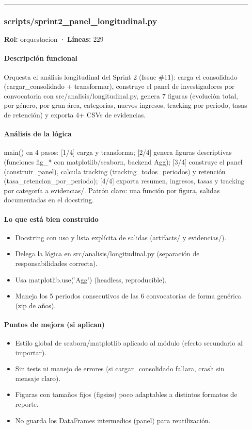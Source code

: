 \medskip
\hrule

\subsubsection{scripts/sprint2\_panel\_longitudinal.py}
\textbf{Rol:} orquestacion · \textbf{Líneas:} 229

\paragraph{Descripción funcional}
Orquesta el análisis longitudinal del Sprint 2 (Issue \#11): carga el consolidado (cargar\_consolidado + transformar), construye el panel de investigadores por convocatoria con src/analisis/longitudinal.py, genera 7 figuras (evolución total, por género, por gran área, categorías, nuevos ingresos, tracking por periodo, tasas de retención) y exporta 4+ CSVs de evidencias.

\paragraph{Análisis de la lógica}
main() en 4 pasos: [1/4] carga y transforma; [2/4] genera figuras descriptivas (funciones fig\_* con matplotlib/seaborn, backend Agg); [3/4] construye el panel (construir\_panel), calcula tracking (tracking\_todos\_periodos) y retención (tasa\_retencion\_por\_periodo); [4/4] exporta resumen, ingresos, tasas y tracking por categoría a evidencias/. Patrón claro: una función por figura, salidas documentadas en el docstring.

\paragraph{Lo que está bien construido}
\begin{itemize}
  \item Docstring con uso y lista explícita de salidas (artifacts/ y evidencias/).
  \item Delega la lógica en src/analisis/longitudinal.py (separación de responsabilidades correcta).
  \item Usa matplotlib.use('Agg') (headless, reproducible).
  \item Maneja los 5 periodos consecutivos de las 6 convocatorias de forma genérica (zip de años).
\end{itemize}

\paragraph{Puntos de mejora (si aplican)}
\begin{itemize}
  \item Estilo global de seaborn/matplotlib aplicado al módulo (efecto secundario al importar).
  \item Sin tests ni manejo de errores (si cargar\_consolidado fallara, crash sin mensaje claro).
  \item Figuras con tamaños fijos (figsize) poco adaptables a distintos formatos de reporte.
  \item No guarda los DataFrames intermedios (panel) para reutilización.
\end{itemize}

